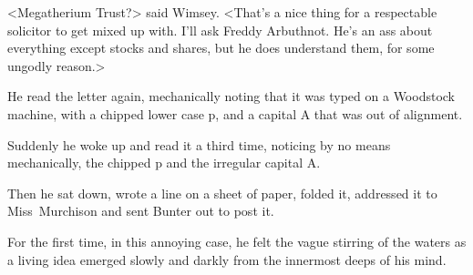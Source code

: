 <Megatherium Trust?> said Wimsey. <That's a nice thing for a respectable solicitor to get mixed up with. I'll ask Freddy Arbuthnot. He's an ass about everything except stocks and shares, but he does understand them, for some ungodly reason.>

He read the letter again, mechanically noting that it was typed on a Woodstock machine, with a chipped lower case p, and a capital A that was out of alignment.

Suddenly he woke up and read it a third time, noticing by no means mechanically, the chipped p and the irregular capital A\@.

Then he sat down, wrote a line on a sheet of paper, folded it, addressed it to Miss~Murchison and sent Bunter out to post it.

For the first time, in this annoying case, he felt the vague stirring of the waters as a living idea emerged slowly and darkly from the innermost deeps of his mind.